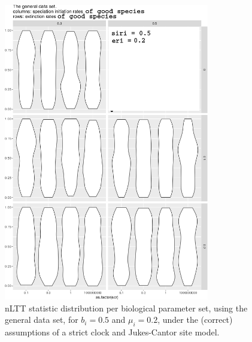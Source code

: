 \documentclass{article}
\begin{document}
\begin{figure}[!htbp]
  \includegraphics[width=0.8\textwidth]{fig_general_6.png}
  \caption{
    nLTT statistic distribution per biological parameter set, using the
    general data set, 
    for $b_i = 0.5$ and $\mu_i = 0.2$, 
    under the (correct) assumptions of a strict clock and Jukes-Cantor site model.
  }
\end{figure}
\end{document}
